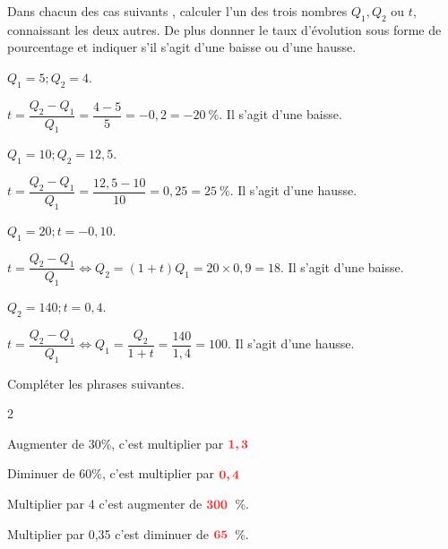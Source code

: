 \documentclass[11pt,a4paper]{article}  %
\begin{document}
Dans chacun des cas suivants , calculer l'un des trois nombres $Q_{1}, Q_{2}$ ou $t$, connaissant les deux autres. De plus donnner le taux d'évolution sous forme de pourcentage et indiquer s'il s'agit d'une baisse ou d'une hausse.
		\begin{enumMet}
		\item {} $Q_{1}=5 ; Q_{2}=4$.
		\begin{corrBox}
			$t=\dfrac{Q_2-Q_1}{Q_1}=\dfrac{4-5}{5}=-0,2=-20\ \%$. Il s'agit d'une baisse.
		\end{corrBox}
		\item $Q_{1}=10 ; Q_{2}=12,5$.
		\begin{corrBox}
			$t=\dfrac{Q_2-Q_1}{Q_1}=\dfrac{12,5-10}{10}=0,25=25\ \%$. Il s'agit d'une hausse.
		\end{corrBox}
		\item $Q_{1}=20 ; t=-0,10$.
		\begin{corrBox}
			$t=\dfrac{Q_2-Q_1}{Q_1} \iff Q_2=(1+t)Q_1=20\times 0,9=18$. Il s'agit d'une baisse.
		\end{corrBox}
		\item $Q_{2}=140 ; t=0,4$.
		\begin{corrBox}
			$t=\dfrac{Q_2-Q_1}{Q_1} \iff Q_1=\dfrac{Q_2}{1+t}=\dfrac{140}{1,4}=100$. Il s'agit d'une hausse.
		\end{corrBox}
	\end{enumMet}


Compléter les phrases suivantes.
\begin{multicols}{2}
	\begin{enumMet}
	\item Augmenter de $30 \%$, c'est multiplier par $\mRouge{1,3}$
	\item Diminuer de $60 \%$, c'est multiplier par $\mRouge{0,4}$
	\item Multiplier par 4 c'est augmenter de $\mRouge{300}$\ \%.
	\item Multiplier par 0,35 c'est diminuer de $\mRouge{65}$\ \%.	
\end{enumMet}
\end{multicols}

\end{document}

